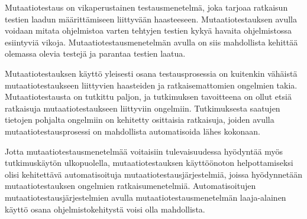 \documentclass[finnish, grading]{tktltiki2}
\theoremstyle{definition}
\theoremstyle{remark}
\begin{document}
Mutaatiotestaus on vikaperustainen testausmenetelmä, joka tarjoaa ratkaisun testien laadun määrittämiseen liittyvään haasteeseen. Mutaatiotestauksen avulla voidaan mitata ohjelmistoa varten tehtyjen testien kykyä havaita ohjelmistossa esiintyviä vikoja. Mutaatiotestausmenetelmän avulla on siis mahdollista kehittää olemassa olevia testejä ja parantaa testien laatua.

Mutaatiotestauksen käyttö yleisesti osana testausprosessia on kuitenkin vähäistä mutaatiotestaukseen liittyvien haasteiden ja ratkaisemattomien ongelmien takia. Mutaatiotestausta on tutkittu paljon, ja tutkimuksen tavoitteena on ollut etsiä ratkaisuja mutaatiotestaukseen liittyviin ongelmiin. Tutkimuksesta saatujen tietojen pohjalta ongelmiin on kehitetty osittaisia ratkaisuja, joiden avulla mutaatiotestausprosessi on mahdollista automatisoida lähes kokonaan.

Jotta mutaatiotestausmenetelmää voitaisiin tulevaisuudessa hyödyntää myös tutkimuskäytön ulkopuolella, mutaatiotestauksen käyttöönoton helpottamiseksi olisi kehitettävä automatisoituja mutaatiotestausjärjestelmiä, joissa hyödynnetään mutaatiotestauksen ongelmien ratkaisumenetelmiä. Automatisoitujen mutaatiotestausjärjestelmien avulla mutaatiotestausmenetelmän laaja-alainen käyttö osana ohjelmistokehitystä voisi olla mahdollista.




\end{document}
